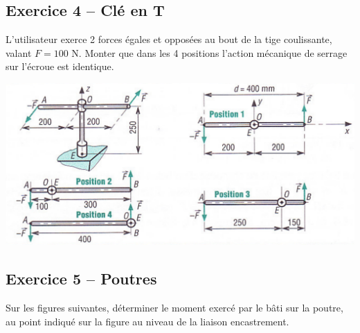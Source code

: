 \documentclass[10pt]{article}
\begin{document}
\subsection*{Exercice 4 -- Clé en T}
L'utilisateur exerce 2 forces égales et opposées au bout de la tige coulissante, valant $F=100$ N. Monter que dans les 4 positions l'action mécanique de serrage sur l'écroue est identique.
\begin{center}
\includegraphics[width=15cm]{images/moment2.pdf}
\end{center}


\subsection*{Exercice 5 -- Poutres}
Sur les figures suivantes, déterminer le moment exercé par le bâti sur la poutre, au point indiqué sur la figure au niveau de la liaison encastrement.
\end{document}

